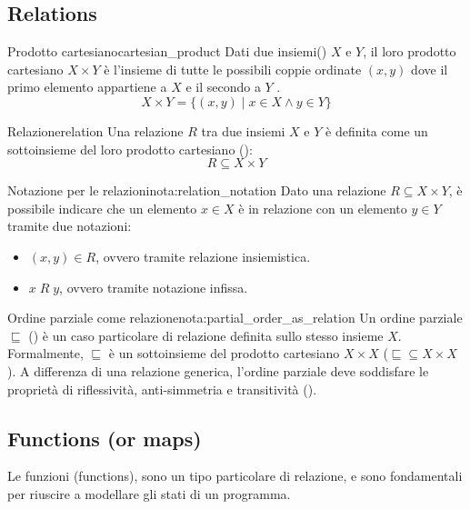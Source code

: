 \subsection{Relations}

\begin{definizione}{Prodotto cartesiano}{cartesian_product}
Dati due insiemi() $X$ e $Y$, il loro prodotto cartesiano $X \times Y$ è
l'insieme di tutte le possibili coppie ordinate $(x, y)$ dove il primo
elemento appartiene a $X$ e il secondo a $Y$ .
\[
X \times Y = \{ (x, y) \mid x \in X \land y \in Y \}
\]
\end{definizione}

\begin{definizione}{Relazione}{relation}
Una relazione $R$ tra due insiemi $X$ e $Y$ è definita come un sottoinsieme
del loro prodotto cartesiano ():
\[
R \subseteq X \times Y
\]
\end{definizione}

\begin{nota}{Notazione per le relazioni}{nota:relation_notation}
Dato una relazione $R \subseteq X \times Y$, è possibile indicare che
un elemento $x \in X$ è in relazione con un elemento $y \in Y$ tramite due
notazioni:
\begin{itemize}
    \item $(x, y) \in R$, ovvero tramite relazione insiemistica.
    \item $x \; R \; y$, ovvero tramite notazione infissa.
\end{itemize}

\end{nota}

\begin{nota}{Ordine parziale come relazione}{nota:partial_order_as_relation}
Un ordine parziale $\sqsubseteq$ () è un caso
particolare di relazione definita sullo stesso insieme $X$.
Formalmente, $\sqsubseteq$ è un sottoinsieme del prodotto cartesiano
$X \times X$ ($\sqsubseteq \subseteq X \times X$).
A differenza di una relazione generica, l'ordine parziale deve soddisfare le
proprietà di riflessività, anti-simmetria e transitività ().
\end{nota}

\subsection{Functions (or maps)}

Le funzioni (functions), sono un tipo particolare di relazione, e sono
fondamentali per riuscire a modellare gli stati di un programma.

